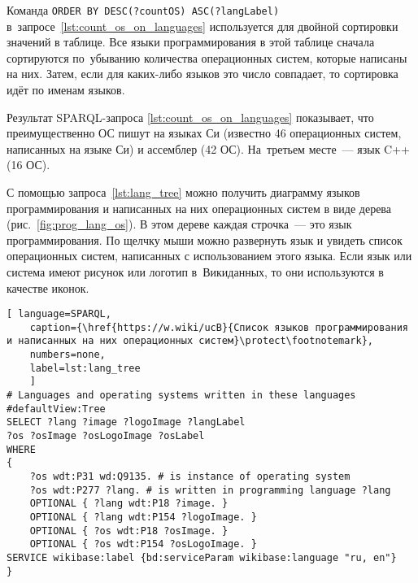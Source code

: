 Команда \lstinline|ORDER BY DESC(?countOS) ASC(?langLabel)| в~запросе~\ref{lst:count_os_on_languages} 
используется для двойной сортировки значений в таблице. 
Все языки программирования в этой таблице сначала сортируются по~убыванию количества операционных систем, 
которые написаны на них. Затем, если для каких-либо языков это число совпадает, 
то сортировка идёт по именам языков.

Результат SPARQL-запроса \ref{lst:count_os_on_languages} показывает, 
что преимущественно ОС пишут на языках Си (известно 46 операционных систем, написанных на языке Си) и ассемблер (42 ОС). 
На~третьем месте~--- язык C++ (16 ОС).



С помощью запроса~\ref{lst:lang_tree} можно получить диаграмму языков программирования 
и написанных на них операционных систем в виде дерева (рис.~\ref{fig:prog_lang_os}). 
В этом дереве каждая строчка~--- это язык программирования. 
По щелчку мыши можно развернуть язык и увидеть список операционных систем, 
написанных с использованием этого языка. 
Если язык или система имеют рисунок или логотип в~Викиданных, 
то они используются в качестве иконок.
%

\begin{lstlisting}[ language=SPARQL, 
	caption={\href{https://w.wiki/ucB}{Список языков программирования и написанных на них операционных систем}\protect\footnotemark},
    numbers=none,
	label=lst:lang_tree
	]
# Languages and operating systems written in these languages
#defaultView:Tree
SELECT ?lang ?image ?logoImage ?langLabel 
?os ?osImage ?osLogoImage ?osLabel 
WHERE 
{
	?os wdt:P31 wd:Q9135. # is instance of operating system
	?os wdt:P277 ?lang. # is written in programming language ?lang
	OPTIONAL { ?lang wdt:P18 ?image. }
	OPTIONAL { ?lang wdt:P154 ?logoImage. }
	OPTIONAL { ?os wdt:P18 ?osImage. }
	OPTIONAL { ?os wdt:P154 ?osLogoImage. }
SERVICE wikibase:label {bd:serviceParam wikibase:language "ru, en"}
}
\end{lstlisting}
%








